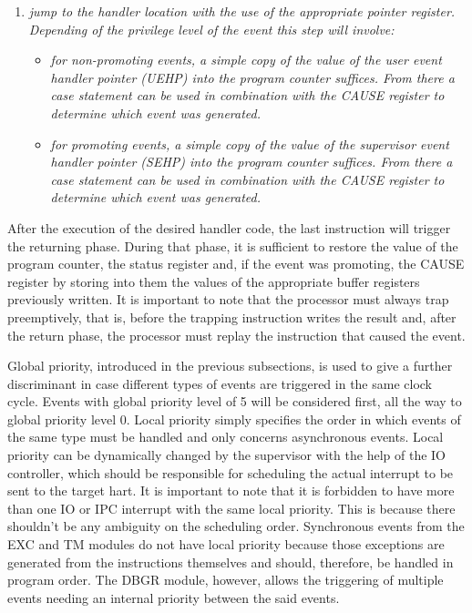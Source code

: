\begin{enumerate}
            \item \textit{jump to the handler location with the use of the appropriate pointer register. Depending of the privilege level of the event this step will involve:}

                \begin{itemize}

                    \item \textit{for non-promoting events, a simple copy of the value of the user event handler pointer (UEHP) into the program counter suffices. From there a case statement can be used in combination with the CAUSE register to determine which event was generated.}

                    \item \textit{for promoting events, a simple copy of the value of the supervisor event handler pointer (SEHP) into the program counter suffices. From there a case statement can be used in combination with the CAUSE register to determine which event was generated.}

                \end{itemize}

        \end{enumerate}

        After the execution of the desired handler code, the last instruction will trigger the returning phase. During that phase, it is sufficient to restore the value of the program counter, the status register and, if the event was promoting, the CAUSE register by storing into them the values of the appropriate buffer registers previously written. It is important to note that the processor must always trap preemptively, that is, before the trapping instruction writes the result and, after the return phase, the processor must replay the instruction that caused the event.

        \vspace{10pt}

        Global priority, introduced in the previous subsections, is used to give a further discriminant in case different types of events are triggered in the same clock cycle. Events with global priority level of 5 will be considered first, all the way to global priority level 0. Local priority simply specifies the order in which events of the same type must be handled and only concerns asynchronous events. Local priority can be dynamically changed by the supervisor with the help of the IO controller, which should be responsible for scheduling the actual interrupt to be sent to the target hart. It is important to note that it is forbidden to have more than one IO or IPC interrupt with the same local priority. This is because there shouldn't be any ambiguity on the scheduling order. Synchronous events from the EXC and TM modules do not have local priority because those exceptions are generated from the instructions themselves and should, therefore, be handled in program order. The DBGR module, however, allows the triggering of multiple events needing an internal priority between the said events.

